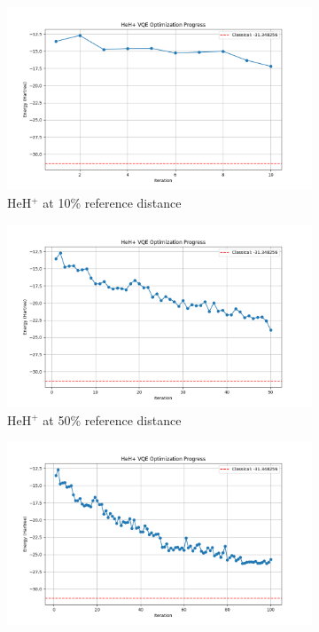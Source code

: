 \documentclass[10pt,twocolumn,a4paper]{article}
\begin{document}
\begin{figure}[t!]
    \centering
    \begin{subfigure}[b]{0.32\textwidth}
        \includegraphics[width=\textwidth]{graphs/vqe_progress_heh+_10.png}
        \caption{HeH$^+$ at 10\% reference distance}
        \label{fig:vqe_progress_normal_10}
    \end{subfigure}
    \hfill
    \begin{subfigure}[b]{0.32\textwidth}
        \includegraphics[width=\textwidth]{graphs/vqe_progress_heh+_50.png}
        \caption{HeH$^+$ at 50\% reference distance}
        \label{fig:vqe_progress_normal_50}
    \end{subfigure}
    \hfill
    \begin{subfigure}[b]{0.32\textwidth}
        \includegraphics[width=\textwidth]{graphs/vqe_progress_heh+_100.png}

\end{subfigure}
\end{figure}
\end{document}

